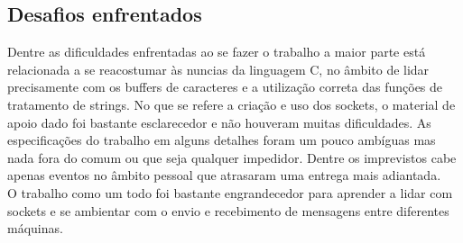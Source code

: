 \documentclass[a4paper]{article}
\begin{document}
\subsection{Desafios enfrentados}
Dentre as dificuldades enfrentadas ao se fazer o trabalho a maior parte está relacionada a se reacostumar às nuncias da linguagem C, no âmbito de lidar precisamente com os buffers de caracteres e a utilização correta das funções de tratamento de strings. No que se refere a criação e uso dos sockets, o material de apoio dado foi bastante esclarecedor e não houveram muitas dificuldades. As especificações do trabalho em alguns detalhes foram um pouco ambíguas mas nada fora do comum ou que seja qualquer impedidor. Dentre os imprevistos cabe apenas eventos no âmbito pessoal que atrasaram uma entrega mais adiantada. \\
O trabalho como um todo foi bastante engrandecedor para aprender a lidar com sockets e se ambientar com o envio e recebimento de mensagens entre diferentes máquinas.
\end{document}
